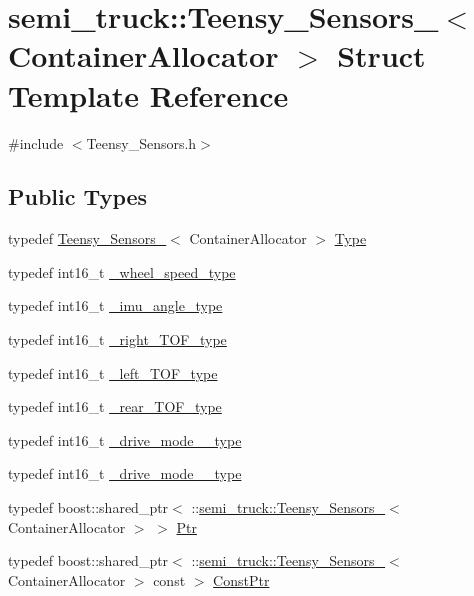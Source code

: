 \hypertarget{structsemi__truck_1_1_teensy___sensors__}{}\section{semi\+\_\+truck\+:\+:Teensy\+\_\+\+Sensors\+\_\+$<$ Container\+Allocator $>$ Struct Template Reference}
\label{structsemi__truck_1_1_teensy___sensors__}


{\ttfamily \#include $<$Teensy\+\_\+\+Sensors.\+h$>$}

\subsection*{Public Types}
\begin{DoxyCompactItemize}
\item 
typedef \hyperlink{structsemi__truck_1_1_teensy___sensors__}{Teensy\+\_\+\+Sensors\+\_\+}$<$ Container\+Allocator $>$ \hyperlink{structsemi__truck_1_1_teensy___sensors___a05a02769de72554dbc9d24a583752523}{Type}
\item 
typedef int16\+\_\+t \hyperlink{structsemi__truck_1_1_teensy___sensors___adca9245fde7f0f8121fed20243c9ae1a}{\+\_\+wheel\+\_\+speed\+\_\+type}
\item 
typedef int16\+\_\+t \hyperlink{structsemi__truck_1_1_teensy___sensors___aaf882f7b6732e41e25877c88eb8a1c7a}{\+\_\+imu\+\_\+angle\+\_\+type}
\item 
typedef int16\+\_\+t \hyperlink{structsemi__truck_1_1_teensy___sensors___adb98ef7b91b8a2c8346a2b36e1816a61}{\+\_\+right\+\_\+\+T\+O\+F\+\_\+type}
\item 
typedef int16\+\_\+t \hyperlink{structsemi__truck_1_1_teensy___sensors___ad6ac104c65141acb58bf4af051941136}{\+\_\+left\+\_\+\+T\+O\+F\+\_\+type}
\item 
typedef int16\+\_\+t \hyperlink{structsemi__truck_1_1_teensy___sensors___ab8ba6b899ad8e9de101aa904e646d7e9}{\+\_\+rear\+\_\+\+T\+O\+F\+\_\+type}
\item 
typedef int16\+\_\+t \hyperlink{structsemi__truck_1_1_teensy___sensors___afd1593af87fe24f82e4cdc3db0695f0d}{\+\_\+drive\+\_\+mode\+\_\+\_\+type}
\item 
typedef int16\+\_\+t \hyperlink{structsemi__truck_1_1_teensy___sensors___aca8d2a953d712ec418fb0d13877b7194}{\+\_\+drive\+\_\+mode\+\_\+\_\+type}
\item 
typedef boost\+::shared\+\_\+ptr$<$ \+::\hyperlink{structsemi__truck_1_1_teensy___sensors__}{semi\+\_\+truck\+::\+Teensy\+\_\+\+Sensors\+\_\+}$<$ Container\+Allocator $>$ $>$ \hyperlink{structsemi__truck_1_1_teensy___sensors___a31b2377d32f460ee7ebdcfe467f70b12}{Ptr}
\item 
typedef boost\+::shared\+\_\+ptr$<$ \+::\hyperlink{structsemi__truck_1_1_teensy___sensors__}{semi\+\_\+truck\+::\+Teensy\+\_\+\+Sensors\+\_\+}$<$ Container\+Allocator $>$ const  $>$ \hyperlink{structsemi__truck_1_1_teensy___sensors___a1c67c299fc5270cf253a6e5fbafe9ce8}{Const\+Ptr}
\end{DoxyCompactItemize}
